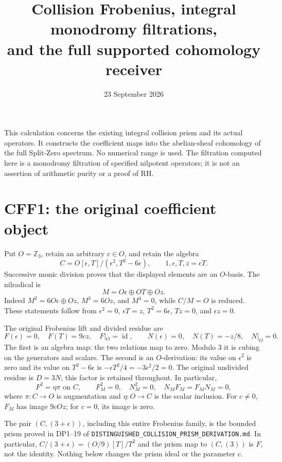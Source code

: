 \documentclass[11pt]{article}
\title{Collision Frobenius, integral monodromy filtrations,\\
and the full supported cohomology receiver}
\author{}
\date{23 September 2026}
\newcommand{\OO}{\mathbb Z_3}
\newcommand{\id}{\operatorname{id}}
\begin{document}
\maketitle

This calculation concerns the existing integral collision prism and
its actual operators. It constructs the coefficient maps into the
abelian-sheaf cohomology of the full Split-Zero spectrum. No numerical
range is used. The filtration computed here is a monodromy filtration
of specified nilpotent operators; it is not an assertion of arithmetic
purity or a proof of RH.

\section{CFF1: the original coefficient object}
Put \(O=\OO\), retain an arbitrary \(c\in O\), and retain the algebra
\[
 C=O[\epsilon,T]/(\epsilon^2,T^2-6\epsilon),\qquad
 1,\epsilon,T,z=\epsilon T.
 \tag{CFF1}
\]
Successive monic division proves that the displayed elements are an
\(O\)-basis. The nilradical is
\[
 M=O\epsilon\oplus OT\oplus Oz.
 \tag{CFF2}
\]
Indeed \(M^2=6O\epsilon\oplus Oz\), \(M^3=6Oz\), and \(M^4=0\), while
\(C/M=O\) is reduced. These statements follow from
\(\epsilon^2=0\), \(\epsilon T=z\), \(T^2=6\epsilon\),
\(Tz=0\), and \(\epsilon z=0\).

The original Frobenius lift and divided residue are
\[
 F(\epsilon)=0,\quad F(T)=9cz,\quad F|_O=\id,\qquad
 N(\epsilon)=0,\quad N(T)=-z/8,\quad N|_O=0 .
 \tag{CFF3}
\]
The first is an algebra map: the two relations map to zero.
Modulo 3 it is cubing on the generators and scalars. The second is
an \(O\)-derivation: its value on \(\epsilon^2\) is zero and its
value on \(T^2-6\epsilon\) is
\(-\epsilon T^2/4=-3\epsilon^2/2=0\). The original undivided residue
is \(D=3N\); this factor is retained throughout. In particular,
\[
 F^2=\eta\pi\text{ on }C,\qquad
 F_M^2=0,\quad N_M^2=0,\quad N_MF_M=F_MN_M=0,
 \tag{CFF4}
\]
where \(\pi:C\to O\) is augmentation and \(\eta:O\to C\) is the
scalar inclusion. For \(c\ne0\), \(F_M\) has image \(9cOz\); for
\(c=0\), its image is zero.

The pair \((C,(3+\epsilon))\), including this entire Frobenius family,
is the bounded prism proved in DP1--19 of
\texttt{DISTINGUISHED\_COLLISION\_PRISM\_DERIVATION.md}.
In particular, \(C/(3+\epsilon)=(O/9)[T]/T^2\) and the prism map
to \((C,(3))\) is \(F\), not the identity. Nothing below changes
the prism ideal or the parameter \(c\).
\end{document}
